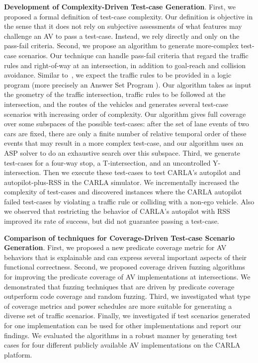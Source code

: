     \textbf{Development of Complexity-Driven Test-case Generation}.  
    First, we proposed a formal definition of test-case complexity.
    Our definition is objective in the sense that it does not rely on subjective assessments of what features may challenge an AV to pass a test-case.
    Instead, we rely directly and only on the pass-fail criteria.
    Second, we propose an algorithm to generate more-complex test-case scenarios.
    Our technique can handle pass-fail criteria that regard the traffic rules and right-of-way at an intersection, in addition to goal-reach and collision avoidance.
    Similar to~\cite{Karimi.2020}, we expect the traffic rules to be provided in a logic program (more precisely an Answer Set Program \cite{Lifschitz.2010}).
    Our algorithm takes as input the geometry of the traffic intersection, traffic rules to be followed at the intersection, and the routes of the vehicles and generates several test-case scenarios with increasing order of complexity.
    Our algorithm gives full coverage over some subspaces of the possible test-cases: after the set of lane events of two cars are fixed, there are only a finite number of relative temporal order of these events that may result in a more complex test-case, and our algorithm uses an ASP solver to do an exhaustive search over this subspace.
    Third, we generate test-cases for a four-way stop, a T-intersection, and an uncontrolled Y-intersection.
    Then we execute these test-cases to test CARLA's autopilot and autopilot-plus-RSS in the CARLA simulator.
    We incrementally increased the complexity of test-cases and discovered instances where the CARLA autopilot failed test-cases by violating a traffic rule or colliding with a non-ego vehicle.
    Also we observed that restricting the behavior of CARLA's autopilot with RSS improved its rate of success, but did not guarantee passing a test-case.

    \textbf{Comparison of techniques for Coverage-Driven Test-case Scenario Generation}.
    First, we proposed a new predicate coverage metric for AV behaviors that is explainable and can express several important aspects of their functional correctness.
    Second, we proposed coverage driven fuzzing algorithms for improving the predicate coverage of AV implementations at intersections.
    We demonstrated that fuzzing techniques that are driven by predicate coverage outperform code coverage and random fuzzing.
    Third, we investigated what type of coverage metrics and power schedules are more suitable for generating a diverse set of traffic scenarios.
    Finally, we investigated if test scenarios generated for one implementation can be used for other implementations and report our findings.
    We evaluated the algorithms in a robust manner by generating test cases for four different publicly available AV implementations on the CARLA platform.






